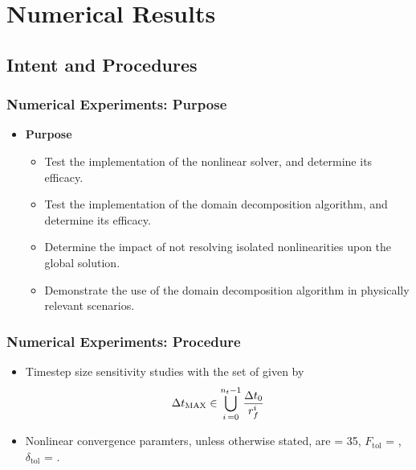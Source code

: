 \documentclass[compress,xcolor=table]{beamer}
\begin{document}
\section[Numerical Results]{Numerical Results}
\subsection[Procedures]{Intent and Procedures}
\begin{frame}
\frametitle{Numerical Experiments: Purpose}
\begin{itemize}
\item{\textbf{Purpose}
\begin{itemize}
\item{Test the implementation of the nonlinear solver, and determine its efficacy.}
\item{Test the implementation of the domain decomposition algorithm, and determine its efficacy.}
\item{Determine the impact of not resolving isolated nonlinearities upon the global solution.}
\item{Demonstrate the use of the domain decomposition algorithm in physically relevant scenarios.}
\end{itemize}
}
\end{itemize}
\end{frame}
\begin{frame}
\frametitle{Numerical Experiments: Procedure}

\begin{itemize}
\item{Timestep size sensitivity studies with the set of \dtmax{} given by
\begin{equation*}
\dtmax{} \in \bigcup^{n_{t}-1}_{i\, = 0} \frac{\dt{}_{0}}{r^{i}_{f}}
\end{equation*}
}
\item{Nonlinear convergence paramters, unless otherwise stated, are \kmax{} = 35, $F_{\text{tol}}$ = , $\delta_{\text{tol}}$ = .}
\end{itemize}

\end{frame}
\end{document}
